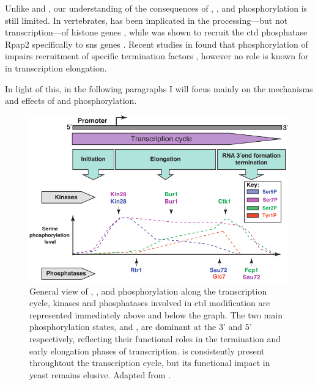 Unlike \sert{} and \serf{}, our understanding of the consequences of \tyr{}, \thr{}, and \sers{} phosphorylation is still limited. 
In vertebrates, \thr{} has been implicated in the processing---but not transcription---of histone genes \cite{hsin:2011:rnap}, while \sers{} was shown to recruit the \gls{ctd} phosphatase Rpap2 specifically to \gls{sns} genes \citep{egloff:2012:role}.
Recent studies in \cer{} found that phosphorylation of \tyr{} impairs recruitment of specific termination factors \cite{mayer:2012:ctd,schreieck:2014:rna} , however no role is known for \tyr{} in transcription elongation.  

In light of this, in the following paragraphs I will focus mainly on the mechanisms and effects of \sert{} and \serf{} phosphorylation.

\begin{figure}[ht]

\centering
\includegraphics[width=\textwidth]{figures/introduction/ctdPhospho}
\caption[CTD phosphorylation states throughout the transcription cycle.]{
General view of \sert{}, \serf{}, and \sers{} phosphorylation along the transcription cycle,
kinases and phosphatases involved in \gls{ctd} modification are represented immediately above and below the graph.
The two main phosphorylation states, \sert{} and \serf{}, are dominant at the 3' and 5' respectively, reflecting their functional roles in the termination and early elongation phases of transcription.
\sers{} is consistently present throughtout the transcription cycle, but its functional impact in yeast remains elusive. Adapted from \citep{egloff:2012:updating}.
}
\label{fig:ctdPhospho}

\end{figure}

